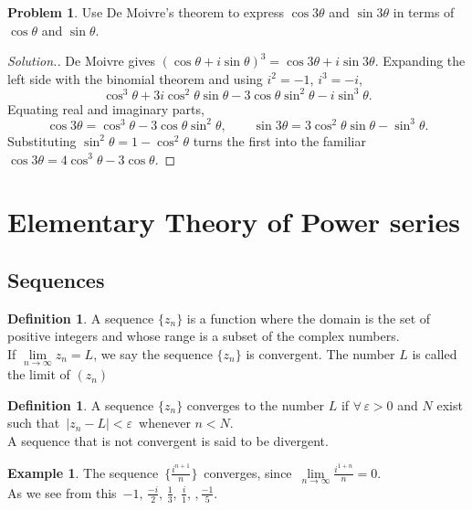 \documentclass[11pt,a4paper]{article}
\theoremstyle{definition}
\newtheorem{definition}[thm]{Definition}
\newtheorem{example}[thm]{Example}
\newtheorem{problemx}{Problem}[section]
\newenvironment{problem}{\begin{problemx}}{\end{problemx}}
\newenvironment{solution}
  {\renewcommand{\qedsymbol}{}\begin{proof}[\textit{Solution}.]}
  {\end{proof}}
\begin{document}
\begin{problem}
Use De Moivre's theorem to express $\cos 3\theta$ and $\sin 3\theta$ in terms of
$\cos\theta$ and $\sin\theta$.
\end{problem}
\begin{solution}
De Moivre gives $(\cos\theta+i\sin\theta)^3=\cos 3\theta+i\sin 3\theta$.
Expanding the left side with the binomial theorem and using $i^2=-1$,
$i^3=-i$,
$$\cos^3\theta+3i\cos^2\theta\sin\theta-3\cos\theta\sin^2\theta-i\sin^3\theta .$$
Equating real and imaginary parts,
$$\cos 3\theta=\cos^3\theta-3\cos\theta\sin^2\theta,\qquad
\sin 3\theta=3\cos^2\theta\sin\theta-\sin^3\theta .$$
Substituting $\sin^2\theta=1-\cos^2\theta$ turns the first into the familiar
$\cos 3\theta=4\cos^3\theta-3\cos\theta$.
\end{solution}


\pagebreak
{\color[wave]{485}\section{Elementary Theory of Power series}}

{\color[wave]{485}\subsection{Sequences}}

\begin{definition}
A sequence $\{z_n\}$ is a function where the domain is the set of positive integers and whose range is a subset of the complex numbers.\\



If $\lim\limits_{n \rightarrow \infty} z_n = L$, we say the sequence $\{z_n\}$ is convergent. The number $L$ is called the limit of $(z_n)$
\end{definition}

\begin{definition}
A sequence $\{z_n\}$ converges to the number $L$ if $\forall\, \varepsilon > 0$ and $N$ exist such that $\,\left|z_n - L\right| < \varepsilon\,$ whenever $n<N$.\\



A sequence that is not convergent is said to be divergent.
\end{definition}

\begin{example}
The sequence $\,\displaystyle{\Big\{\frac{i^{n + 1}}{n}\Big\}}\,$ converges, since $\, \lim\limits_{n\rightarrow \infty} \frac{i^{1 + n}}{n} = 0$.\\

As we see from this $\,\displaystyle{-1,\, \frac{-i}{2}, \, \frac{1}{3},\,\frac{i}{1}, \,, \frac{-1}{5}}$.
\end{example}
\end{document}
